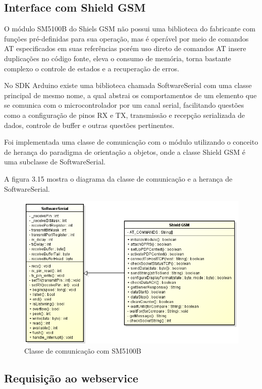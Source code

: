 \subsection{Interface com Shield GSM}

O módulo SM5100B do Shiels GSM não possui uma biblioteca do fabricante com funções pré-definidas para sua operação, mas é operável por meio de comandos AT especificados em suas referências porém uso direto de comandos AT insere duplicações no código fonte, eleva o consumo de memória, torna bastante complexo o controle de estados e a recuperação de erros.

No SDK Arduino existe uma biblioteca chamada SoftwareSerial com uma classe principal de mesmo nome, a qual abstrai os comportamentos de um elemento que se comunica com o microcontrolador por um canal serial, facilitando questões como a configuração de pinos RX e TX, transmissão e recepção serializada de dados, controle de buffer e outras questões pertinentes.

Foi implementada uma classe de comunicação com o módulo utilizando o conceito de herança do paradigma de orientação a objetos, onde a classe Shield GSM é uma subclasse de SoftwareSerial. 

A figura 3.15 mostra o diagrama da classe de comunicação e a herança de SoftwareSerial.

\begin{figure}[!htb]
	\centering
	\includegraphics[width=\textwidth]{figures/lib_gsm.png}
	\caption{Classe de comunicação com SM5100B}
	\label{1}
\end{figure}

\subsection{Requisição ao webservice}

